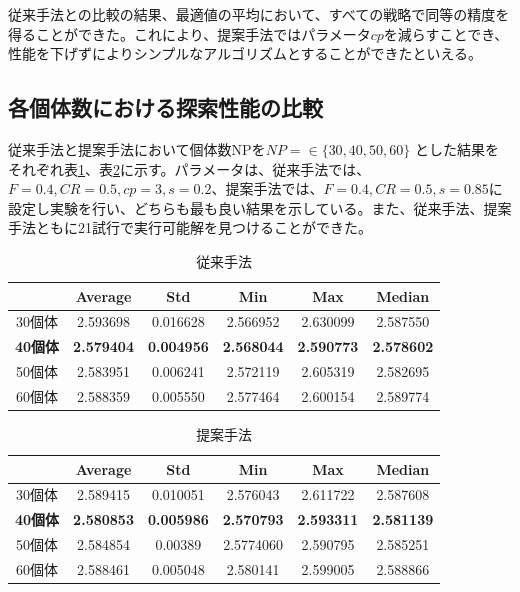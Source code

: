 \documentclass[a4paper,12pt]{jsreport}
\begin{document}
従来手法との比較の結果、最適値の平均において、すべての戦略で同等の精度を得ることができた。これにより、提案手法ではパラメータ$cp$を減らすことでき、性能を下げずによりシンプルなアルゴリズムとすることができたといえる。%


\subsection{各個体数における探索性能の比較}
従来手法と提案手法において個体数NPを$NP= \in  \{30,40,50,60\}$
とした結果をそれぞれ表\ref{tbl:個体数従来}、表\ref{tbl:個体数提案}に示す。パラメータは、従来手法では、$F=0.4,CR=0.5,cp=3,s=0.2$、提案手法では、$F=0.4,CR=0.5,s=0.85$に設定し実験を行い、どちらも最も良い結果を示している。また、従来手法、提案手法ともに21試行で実行可能解を見つけることができた。
\begin{table}[htbp]
\begin{center}
\caption{従来手法}
\label{tbl:個体数従来}
\begin{tabular}{|c|c|c|c|c|c|}
\hline
      & Average & Std & Min & Max & Median  \\ \hline
30個体 & 2.593698	& 0.016628 & 2.566952 & 2.630099 & 2.587550\\ \hline
\bf40個体 & \bf2.579404 & \bf0.004956 & \bf2.568044 & \bf2.590773 & \bf2.578602\\ \hline
50個体 & 2.583951 & 0.006241 & 2.572119 & 2.605319 & 2.582695\\ \hline
60個体 & 2.588359 & 0.005550 & 2.577464 & 2.600154 & 2.589774\\ \hline
\end{tabular}
\end{center}
\end{table}

\begin{table}[htbp]
\begin{center}
\caption{提案手法}
\label{tbl:個体数提案}
\begin{tabular}{|c|c|c|c|c|c|}
\hline
      & Average & Std & Min & Max & Median  \\ \hline
30個体 & 2.589415	& 0.010051 & 2.576043 & 2.611722 & 2.587608\\ \hline
\bf40個体 & \bf2.580853 & \bf0.005986 & \bf2.570793 & \bf2.593311 & \bf2.581139\\ \hline
50個体 & 2.584854 & 0.00389 & 2.5774060 & 2.590795 & 2.585251\\ \hline
60個体 & 2.588461 & 0.005048 & 2.580141 & 2.599005 & 2.588866\\ \hline
\end{tabular}
\end{center}
\end{table}
\end{document}
